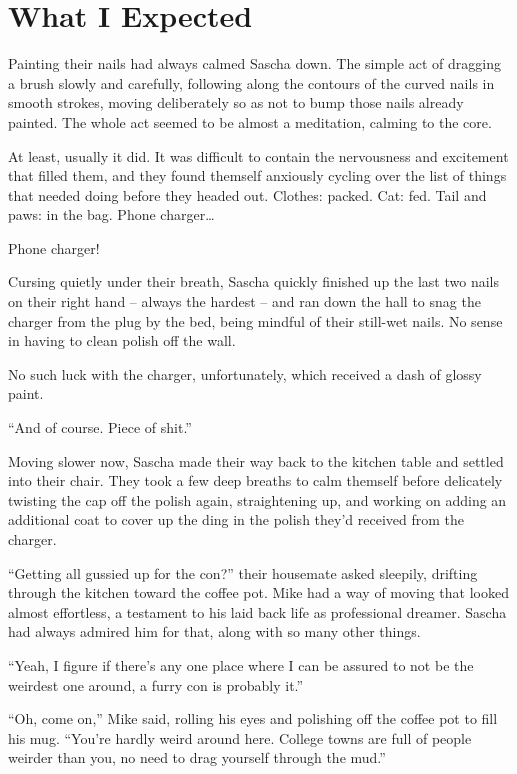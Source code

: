\chapter{What I Expected}

Painting their nails had always calmed Sascha down. The simple act of dragging a brush slowly and carefully, following along the contours of the curved nails in smooth strokes, moving deliberately so as not to bump those nails already painted. The whole act seemed to be almost a meditation, calming to the core.

At least, usually it did. It was difficult to contain the nervousness and excitement that filled them, and they found themself anxiously cycling over the list of things that needed doing before they headed out. Clothes: packed. Cat: fed. Tail and paws: in the bag. Phone charger\ldots{}

Phone charger!

Cursing quietly under their breath, Sascha quickly finished up the last two nails on their right hand -- always the hardest -- and ran down the hall to snag the charger from the plug by the bed, being mindful of their still-wet nails. No sense in having to clean polish off the wall.

No such luck with the charger, unfortunately, which received a dash of glossy paint.

``And of course. Piece of shit.''

Moving slower now, Sascha made their way back to the kitchen table and settled into their chair. They took a few deep breaths to calm themself before delicately twisting the cap off the polish again, straightening up, and working on adding an additional coat to cover up the ding in the polish they'd received from the charger.

``Getting all gussied up for the con?'' their housemate asked sleepily, drifting through the kitchen toward the coffee pot. Mike had a way of moving that looked almost effortless, a testament to his laid back life as professional dreamer. Sascha had always admired him for that, along with so many other things.

``Yeah, I figure if there's any one place where I can be assured to not be the weirdest one around, a furry con is probably it.''

``Oh, come on,'' Mike said, rolling his eyes and polishing off the coffee pot to fill his mug. ``You're hardly weird around here. College towns are full of people weirder than you, no need to drag yourself through the mud.''

